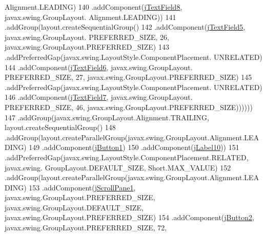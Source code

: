 \begin{DoxyCode}
      Alignment.LEADING)
140                                         .addComponent(\mbox{\hyperlink{class_interfaz_package_1_1_alta_diccionario_a3e91b2eb94fa14f68ad137f48e0500f6}{jTextField8}}, javax.swing.GroupLayout.
      Alignment.LEADING))
141                                     .addGroup(layout.createSequentialGroup()
142                                         .addComponent(\mbox{\hyperlink{class_interfaz_package_1_1_alta_diccionario_a56756a5f37a4a3056ce24d5570b99d61}{jTextField5}}, javax.swing.GroupLayout.
      PREFERRED\_SIZE, 26, javax.swing.GroupLayout.PREFERRED\_SIZE)
143                                         .addPreferredGap(javax.swing.LayoutStyle.ComponentPlacement.
      UNRELATED)
144                                         .addComponent(\mbox{\hyperlink{class_interfaz_package_1_1_alta_diccionario_af4d8c6da79f9c1a9c5d4d8b9f70935c0}{jTextField6}}, javax.swing.GroupLayout.
      PREFERRED\_SIZE, 27, javax.swing.GroupLayout.PREFERRED\_SIZE)
145                                         .addPreferredGap(javax.swing.LayoutStyle.ComponentPlacement.
      UNRELATED)
146                                         .addComponent(\mbox{\hyperlink{class_interfaz_package_1_1_alta_diccionario_a21d52c5fe53e1a05874c6771dc828a1d}{jTextField7}}, javax.swing.GroupLayout.
      PREFERRED\_SIZE, 46, javax.swing.GroupLayout.PREFERRED\_SIZE))))))
147                     .addGroup(javax.swing.GroupLayout.Alignment.TRAILING, layout.createSequentialGroup()
148                         .addGroup(layout.createParallelGroup(javax.swing.GroupLayout.Alignment.LEADING)
149                             .addComponent(\mbox{\hyperlink{class_interfaz_package_1_1_alta_diccionario_a0f3026ebbc0c7a84616c54c8279221e6}{jButton1}})
150                             .addComponent(\mbox{\hyperlink{class_interfaz_package_1_1_alta_diccionario_a49c268b57b92d0d57a86f0350e887083}{jLabel10}}))
151                         .addPreferredGap(javax.swing.LayoutStyle.ComponentPlacement.RELATED, javax.swing.
      GroupLayout.DEFAULT\_SIZE, Short.MAX\_VALUE)
152                         .addGroup(layout.createParallelGroup(javax.swing.GroupLayout.Alignment.LEADING)
153                             .addComponent(\mbox{\hyperlink{class_interfaz_package_1_1_alta_diccionario_a0b33f28ce4ff536b4ef1fa9b546c8ae4}{jScrollPane1}}, javax.swing.GroupLayout.PREFERRED\_SIZE,
       javax.swing.GroupLayout.DEFAULT\_SIZE, javax.swing.GroupLayout.PREFERRED\_SIZE)
154                             .addComponent(\mbox{\hyperlink{class_interfaz_package_1_1_alta_diccionario_a521eb08d96dea01d2c690fcbf9804e57}{jButton2}}, javax.swing.GroupLayout.PREFERRED\_SIZE, 72, 

\end{DoxyCode}
